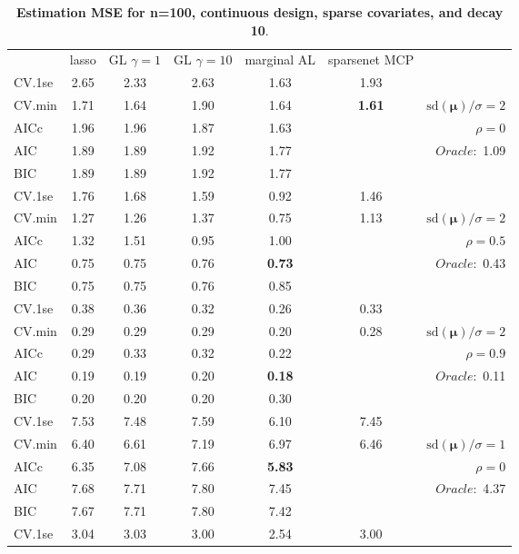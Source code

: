 \clearpage
\begin{table}\vspace{-.5cm}
\caption[l]{ { \bf Estimation MSE for n=100, continuous design, 
sparse covariates, and  decay  10}.}
\vspace{-.5cm}
\footnotesize{}
\begin{center}
\begin{tabular}{l*{5}{c}|r}
& lasso & GL $\gamma=1$ & GL $\gamma=10$ & marginal AL & sparsenet MCP  & \\
 \cline{1-7}
CV.1se & 2.65 & 2.33 & 2.63 & 1.63 & 1.93 & \\
CV.min & 1.71 & 1.64 & 1.90 & 1.64 & {\bf 1.61} &  $\mathrm{sd}(\mathbf{\mu})/\sigma=2$ \\
AICc & 1.96 & 1.96 & 1.87 & 1.63 & & $\rho=0$ \\
AIC & 1.89 & 1.89 & 1.92 & 1.77 & &  \multirow{2}{*}{$Oracle: $ 1.09} \\
BIC & 1.89 & 1.89 & 1.92 & 1.77 & &  \\
 \hline 
CV.1se & 1.76 & 1.68 & 1.59 & 0.92 & 1.46 & \\
CV.min & 1.27 & 1.26 & 1.37 & 0.75 & 1.13 &  $\mathrm{sd}(\mathbf{\mu})/\sigma=2$ \\
AICc & 1.32 & 1.51 & 0.95 & 1.00 & & $\rho=0.5$ \\
AIC & 0.75 & 0.75 & 0.76 & {\bf 0.73} & &  \multirow{2}{*}{$Oracle: $ 0.43} \\
BIC & 0.75 & 0.75 & 0.76 & 0.85 & &  \\
 \hline 
CV.1se & 0.38 & 0.36 & 0.32 & 0.26 & 0.33 & \\
CV.min & 0.29 & 0.29 & 0.29 & 0.20 & 0.28 &  $\mathrm{sd}(\mathbf{\mu})/\sigma=2$ \\
AICc & 0.29 & 0.33 & 0.32 & 0.22 & & $\rho=0.9$ \\
AIC & 0.19 & 0.19 & 0.20 & {\bf 0.18} & &  \multirow{2}{*}{$Oracle: $ 0.11} \\
BIC & 0.20 & 0.20 & 0.20 & 0.30 & &  \\
 \hline 
CV.1se & 7.53 & 7.48 & 7.59 & 6.10 & 7.45 & \\
CV.min & 6.40 & 6.61 & 7.19 & 6.97 & 6.46 &  $\mathrm{sd}(\mathbf{\mu})/\sigma=1$ \\
AICc & 6.35 & 7.08 & 7.66 & {\bf 5.83} & & $\rho=0$ \\
AIC & 7.68 & 7.71 & 7.80 & 7.45 & &  \multirow{2}{*}{$Oracle: $ 4.37} \\
BIC & 7.67 & 7.71 & 7.80 & 7.42 & &  \\
 \hline 
CV.1se & 3.04 & 3.03 & 3.00 & 2.54 & 3.00 & \\

\end{tabular}
\end{center}
\end{table}
